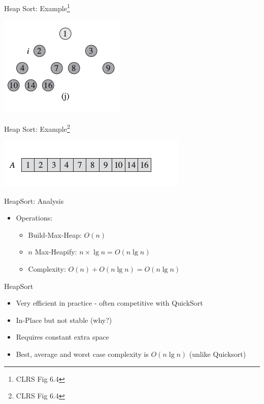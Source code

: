 \documentclass{beamer}
\begin{document}
\begin{frame}{Heap Sort: Example\footnote{CLRS Fig 6.4}}
    \begin{center}
        \includegraphics[scale=0.7]{heapSort10.png}
    \end{center}
\end{frame}


\begin{frame}{Heap Sort: Example\footnote{CLRS Fig 6.4}}
    \begin{center}
        \includegraphics[scale=0.7]{heapSort11.png}
    \end{center}
\end{frame}


\begin{frame}{HeapSort: Analysis}
    \begin{itemize}
        \item Operations: 
        \begin{itemize}
            \item Build-Max-Heap: \pause $O(n)$
            \item $n$ Max-Heapify: \pause $n \times \lg n = O(n \lg n)$
            \item Complexity: $O(n) + O(n \lg n) = O(n \lg n)$
        \end{itemize}
    \end{itemize}
\end{frame}

\begin{frame}{HeapSort}
    \begin{itemize}
        \item Very efficient in practice - often competitive with QuickSort
        \item In-Place but not stable (why?)
        \item Requires constant extra space
        \item Best, average and worst case complexity is $O(n \lg n)$ (unlike Quicksort)
    \end{itemize}
\end{frame}
\end{document}
